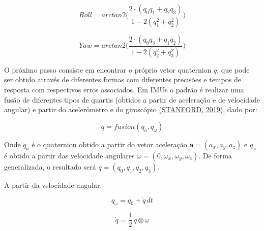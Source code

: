 \documentclass[a4paper, 12pt]{article}
\begin{document}
            \begin{equation}
                Roll = arctan2\bigg(\frac{2\cdot(q_0q_1 + q_2q_3)}{1-2(q_1^2 + q_2^2)}\bigg)    
            \end{equation}

            \begin{equation}
                Yaw = arctan2\bigg(\frac{2\cdot(q_0q_3 + q_1q_2)}{1-2(q_2^2 + q_3^2)}\bigg)    
            \end{equation}
            \vspace{-.3cm}

            O próximo passo consiste em encontrar o próprio vetor quaternion $q$, que pode ser obtido através de diferentes formas com diferentes precisões e tempos de resposta com respectivos erros associados. Em IMUs o padrão é realizar uma fusão de diferentes tipos de quartis (obtidos a partir de aceleração e de velocidade angular) e partir do acelerômetro e do giroscópio \hyperlink{STANFORD}{(STANFORD, 2019)}, dado por:
            \vspace{-0.3cm}

            \begin{equation}
                q = fusion(q_a, q_\omega)
            \end{equation}

            Onde $q_a$ é o quaternion obtido a partir do vetor aceleração $\textbf{a} = (a_x, a_y, a_z)$ e $q_\omega$ é obtido a partir das velocidade angulares $\omega = (0, \omega_x, \omega_y, \omega_z)$. De forma generalizada, o resultado será $q = (q_0, q_1, q_2, q_3)$.

            \vspace{.4cm}
            \noindent\ponto A partir da velocidade angular. 
            \vspace{-.5cm}
            
            \begin{equation}
                q_\omega = q_0 + \dot{q} \, dt
            \end{equation}

            \begin{equation}
                \dot{q} = \frac{1}{2} \, q \otimes \omega  
            \end{equation}
            
\end{document}
